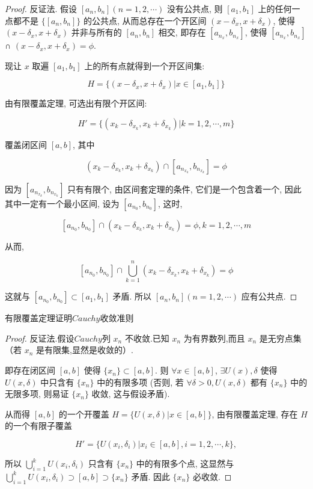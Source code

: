 \begin{proof}
	反证法. 假设 $[a_n, b_n](n = 1, 2, \cdots)$ 没有公共点, 则 $[a_1, b_1]$ 上的任何一点都不是 $\{[a_n, b_n]\}$ 的公共点, 从而总存在一个开区间 $(x - \delta_x, x + \delta_x)$, 使得 $(x - \delta_x, x + \delta_x)$ 并非与所有的 $[a_n, b_n]$ 相交, 即存在 $[a_{n_x}, b_{n_x}]$, 使得 $[a_{n_x}, b_{n_x}]$ ∩ $(x - \delta_x, x + \delta_x) = \phi$.

现让 $x$ 取遍 $[a_1, b_1]$ 上的所有点就得到一个开区间集:

$$H = \{(x - \delta_x, x + \delta_x) | x \in [a_1, b_1]\}  $$

由有限覆盖定理, 可选出有限个开区间:

$$H' = \{(x_{k} - \delta_{x_k}, x_{k} + \delta_{x_k}) | k = 1, 2, \cdots, m\}  $$

覆盖闭区间 $[a, b]$, 其中

$$(x_{k} - \delta_{x_k}, x_{k} + \delta_{x_k}) \cap [a_{n_{x_k}}, b_{n_{x_k}}] = \phi  $$

因为 $[a_{n_{x_k}}, b_{n_{x_k}}]$ 只有有限个, 由区间套定理的条件, 它们是一个包含着一个, 因此其中一定有一个最小区间, 设为 $[a_{n_0}, b_{n_0}]$, 这时,

$$[a_{n_0}, b_{n_0}] \cap (x_{k} - \delta_{x_k}, x_{k} + \delta_{x_k}) = \phi, k = 1, 2, \cdots, m $$

从而,

$$[a_{n_0}, b_{n_0}] \cap \bigcup_{k=1}^{n} (x_{k} - \delta_{x_k}, x_{k} + \delta_{x_k}) = \phi $$

这就与 $[a_{n_0}, b_{n_0}] \subset [a_1, b_1]$ 矛盾. 所以 $[a_n, b_n](n = 1, 2, \cdots)$ 应有公共点.

\end{proof}
\begin{proposition}
	有限覆盖定理证明$Cauchy$收敛准则
\end{proposition}

\begin{proof}
	反证法.假设$Cauchy$列 ${x_n}$ 不收敛.已知 ${x_n}$ 为有界数列,而且 ${x_n}$ 是无穷点集（若 ${x_n}$ 是有限集,显然是收敛的）.

即存在闭区间 $[a, b]$ 使得 $\{x_n\} \subset [a, b]$. 则 $\forall x \in [a, b]$, $\exists U(x), \delta$ 使得 $U(x, \delta)$ 中只含有 $\{x_n\}$ 中的有限多项 (否则, 若 $\forall \delta > 0, U(x, \delta)$ 都有 $\{x_n\}$ 中的无限多项, 则易证 $\{x_n\}$ 收敛, 这与假设矛盾).

从而得 $[a, b]$ 的一个开覆盖 $H = \{U(x, \delta) | x \in [a, b]\}$, 由有限覆盖定理, 存在 $H$ 的一个有限子覆盖

$$H' = \{U(x_i, \delta_i) | x_i \in [a, b], i = 1, 2, \cdots, k\}, $$

所以 $\bigcup_{i=1}^{k} U(x_i, \delta_i)$ 只含有 $\{x_n\}$ 中的有限多个点, 这显然与 $\bigcup_{i=1}^{k} U(x_i, \delta_i) \supset [a, b] \supset \{x_n\}$ 矛盾. 因此 $\{x_n\}$ 必收敛.

\end{proof}


